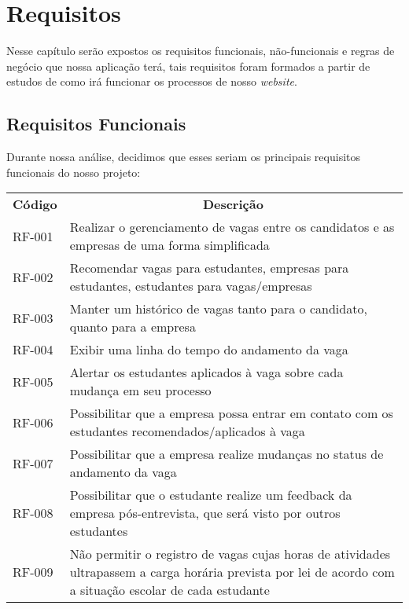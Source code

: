\chapter{Requisitos}

Nesse capítulo serão expostos os requisitos funcionais, não-funcionais e regras de negócio que nossa aplicação terá, tais requisitos foram formados a partir de estudos de como irá funcionar os processos de nosso \emph{website}.

\section{Requisitos Funcionais}

Durante nossa análise, decidimos que esses seriam os principais requisitos funcionais do nosso projeto:

\begin{table}[]
	\begin{tabular}{ll}
		\multicolumn{1}{c}{\textbf{Código}} & \multicolumn{1}{c}{\textbf{Descrição}}                                                                                                 \\
		RF-001          & Realizar o gerenciamento de vagas entre os candidatos e as empresas de uma forma simplificada                                                              \\
		RF-002          & Recomendar vagas para estudantes, empresas para estudantes, estudantes para vagas/empresas                                                                 \\
		RF-003          & Manter um histórico de vagas tanto para o candidato, quanto para a empresa                                                                                 \\
		RF-004          & Exibir uma linha do tempo do andamento da vaga                                                                                                             \\
		RF-005          & Alertar os estudantes aplicados à vaga sobre cada mudança em seu processo                                                                                  \\
		RF-006          & Possibilitar que a empresa possa entrar em contato com os estudantes recomendados/aplicados à vaga                                                         \\
		RF-007          & Possibilitar que a empresa realize mudanças no status de andamento da vaga                                                                                 \\
		RF-008          & Possibilitar que o estudante realize um feedback da empresa pós-entrevista, que será visto por outros estudantes                                           \\
		RF-009          & Não permitir o registro de vagas cujas horas de atividades ultrapassem a carga horária prevista por lei de acordo com a situação escolar de cada estudante
	\end{tabular}
\end{table}

